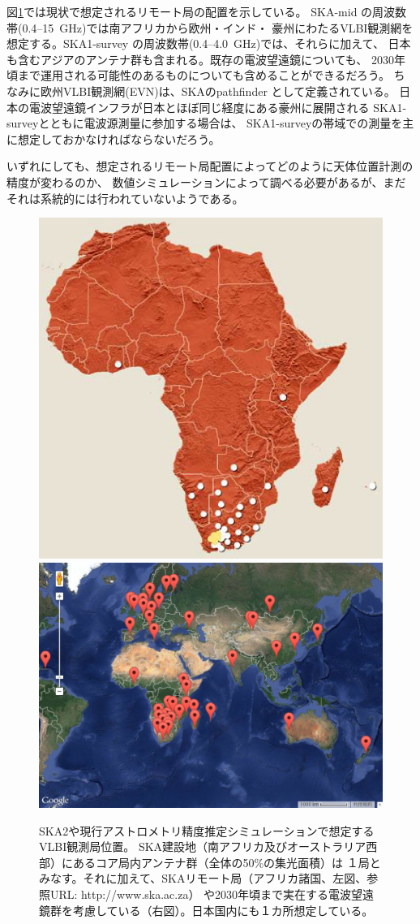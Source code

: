 図\ref{c7.s2.f4}では現状で想定されるリモート局の配置を示している。
SKA-mid の周波数帯(0.4--15~GHz)では南アフリカから欧州・インド・
豪州にわたるVLBI観測網を想定する。SKA1-survey の周波数帯(0.4--4.0~GHz)では、それらに加えて、
日本も含むアジアのアンテナ群も含まれる。既存の電波望遠鏡についても、
2030年頃まで運用される可能性のあるものについても含めることができるだろう。
ちなみに欧州VLBI観測網(EVN)は、SKAのpathfinder として定義されている。
日本の電波望遠鏡インフラが日本とほぼ同じ経度にある豪州に展開される
SKA1-surveyとともに電波源測量に参加する場合は、
SKA1-surveyの帯域での測量を主に想定しておかなければならないだろう。

いずれにしても、想定されるリモート局配置によってどのように天体位置計測の精度が変わるのか、
数値シミュレーションによって調べる必要があるが、まだそれは系統的には行われていないようである。

\begin{figure}[t]
\includegraphics[width=0.425\linewidth]{astrometry/SKASA_stations_2011.eps}
\includegraphics[width=0.575\linewidth]{astrometry/SKA_and_GVN.eps}
\caption{SKA2や現行アストロメトリ精度推定シミュレーションで想定するVLBI観測局位置。
SKA建設地（南アフリカ及びオーストラリア西部）にあるコア局内アンテナ群（全体の50\%の集光面積）は
１局とみなす。それに加えて、SKAリモート局（アフリカ諸国、左図、参照URL: http://www.ska.ac.za）
や2030年頃まで実在する電波望遠鏡群を考慮している（右図）。日本国内にも１カ所想定している。}\label{c7.s2.f4}
\end{figure}

